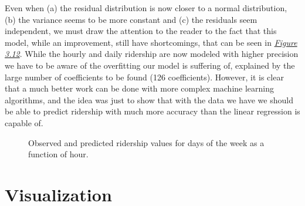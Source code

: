 \documentclass[a4paper,12pt,english]{sphinxmanual}
\begin{document}
Even when (a) the residual distribution is now closer to a normal distribution,
(b) the variance seems to be more constant and (c) the residuals seem independent, we
must draw the attention to the reader to the fact that this model, while an improvement,
still have shortcomings, that can be seen in {\hyperref[section2:figure312]{\emph{Figure 3.12}}}. While
the hourly and daily ridership are now modeled with higher precision we have to
be aware of the overfitting our model is suffering of, explained by the large
number of coefficients to be found (126 coefficients). However, it is clear
that a much better work can be done with more complex machine learning algorithms,
and the idea was just to show that with the data we have we should be able to
predict ridership with much more accuracy than the linear regression is capable
of.
\begin{figure}[htbp]
\centering
\capstart

\caption{Observed and predicted ridership values for days of the week as a function of
hour.}\label{section2:figure312}\end{figure}


\chapter{Visualization}
\label{section3:visualization}\label{section3::doc}
\end{document}
